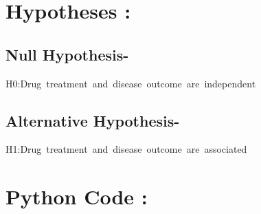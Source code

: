 \documentclass[
]{article}
\begin{document}
\section{Hypotheses :}\label{hypotheses-1}

\subsection{Null Hypothesis-}\label{null-hypothesis--1}

H0:Drug~treatment~and~disease~outcome~are~independent

\subsection{Alternative Hypothesis-}\label{alternative-hypothesis--1}

H1:Drug~treatment~and~disease~outcome~are~associated

\section{\texorpdfstring{\textbf{Python Code
:}}{Python Code :}}\label{python-code-9}
\end{document}
